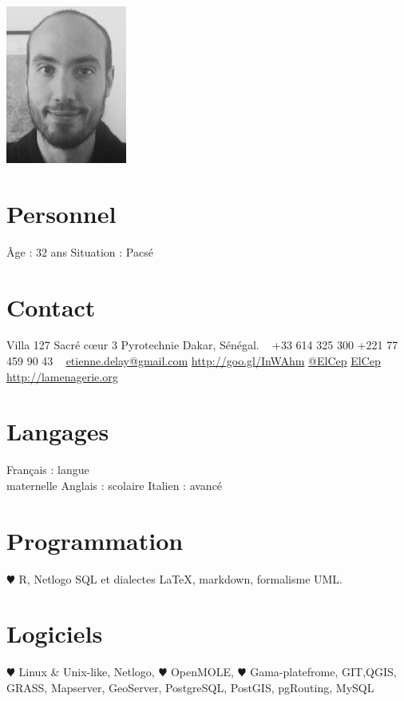 \documentclass[]{cv-etienne}
\begin{document}

\begin{aside} %
\includegraphics{img/delay_s}
\section{Personnel}
Âge : 32 ans
Situation : Pacsé
\section{Contact}
Villa 127
Sacré c\oe{}ur 3 Pyrotechnie
Dakar, Sénégal.
~
+33 614 325 300
+221 77 459 90 43
~
{\color{lightgray}{\FA \faEnvelope}} \href{mailto:etienne.delay@gmail.com}{\footnotesize etienne.delay@gmail.com}
{\color{linkedin}{\FA \faLinkedin}} \href{https://fr.linkedin.com/in/etienne-delay-8871a45b}{\footnotesize http://goo.gl/InWAhm}
{\color{twitter}{\FA \faTwitter}} {\footnotesize \href{https://twitter.com/ElCep}{@ElCep}}
{\color{github}{\FA \faGithub}} {\footnotesize \href{https://github.com/ElCep}{ElCep}}
{\color{lightgray}{\FA \faHome}} {\footnotesize \href{http://elcep.legtux.org}{http://lamenagerie.org}}
\section{Langages}
Français : langue\\ maternelle
Anglais : scolaire
Italien : avancé
\section{Programmation}
{\color{red} $\varheartsuit$} R, Netlogo
SQL et dialectes
\LaTeX, markdown,
formalisme UML.
\section{Logiciels}
{\color{red} $\varheartsuit$} Linux \& Unix-like,
Netlogo, {\color{red} $\varheartsuit$} OpenMOLE,
{\color{red} $\varheartsuit$} Gama-platefrome,
GIT,QGIS, GRASS, Mapserver, GeoServer,
PostgreSQL, PostGIS,
pgRouting, MySQL
\end{aside}
\end{document}
